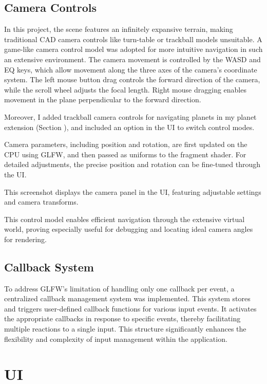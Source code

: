 \subsection{Camera Controls}

In this project, the scene features an infinitely expansive terrain, making traditional CAD camera controls like turn-table or trackball models unsuitable. A game-like camera control model was adopted for more intuitive navigation in such an extensive environment. The camera movement is controlled by the WASD and EQ keys, which allow movement along the three axes of the camera's coordinate system. The left mouse button drag controls the forward direction of the camera, while the scroll wheel adjusts the focal length. Right mouse dragging enables movement in the plane perpendicular to the forward direction. 

Moreover, I added trackball camera controls \cite{noauthor_object_nodate} for navigating planets in my planet extension (Section ), and included an option in the UI to switch control modes.

Camera parameters, including position and rotation, are first updated on the CPU using GLFW, and then passed as uniforms to the fragment shader. For detailed adjustments, the precise position and rotation can be fine-tuned through the UI.

{This screenshot displays the camera panel in the UI, featuring adjustable settings and camera transforms. }

This control model enables efficient navigation through the extensive virtual world, proving especially useful for debugging and locating ideal camera angles for rendering.

\subsection{Callback System}

To address GLFW's limitation of handling only one callback per event, a centralized callback management system was implemented. This system stores and triggers user-defined callback functions for various input events. It activates the appropriate callbacks in response to specific events, thereby facilitating multiple reactions to a single input. This structure significantly enhances the flexibility and complexity of input management within the application.

\section{UI}

